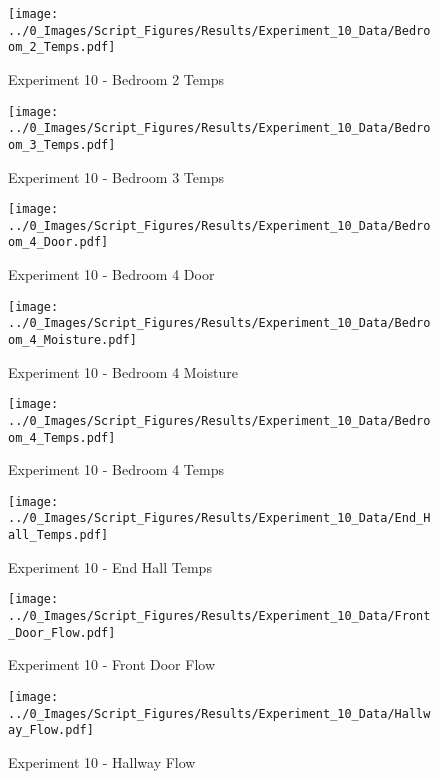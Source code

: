 	\begin{figure}[H]
		\centering
		\texttt{[image: ../0\_Images/Script\_Figures/Results/Experiment\_10\_Data/Bedroom\_2\_Temps.pdf]}
		\caption[]{Experiment 10 - Bedroom 2 Temps}
	\end{figure}
 
	\clearpage

	\begin{figure}[H]
		\centering
		\texttt{[image: ../0\_Images/Script\_Figures/Results/Experiment\_10\_Data/Bedroom\_3\_Temps.pdf]}
		\caption[]{Experiment 10 - Bedroom 3 Temps}
	\end{figure}
 

	\begin{figure}[H]
		\centering
		\texttt{[image: ../0\_Images/Script\_Figures/Results/Experiment\_10\_Data/Bedroom\_4\_Door.pdf]}
		\caption[]{Experiment 10 - Bedroom 4 Door}
	\end{figure}
 
	\clearpage

	\begin{figure}[H]
		\centering
		\texttt{[image: ../0\_Images/Script\_Figures/Results/Experiment\_10\_Data/Bedroom\_4\_Moisture.pdf]}
		\caption[]{Experiment 10 - Bedroom 4 Moisture}
	\end{figure}
 

	\begin{figure}[H]
		\centering
		\texttt{[image: ../0\_Images/Script\_Figures/Results/Experiment\_10\_Data/Bedroom\_4\_Temps.pdf]}
		\caption[]{Experiment 10 - Bedroom 4 Temps}
	\end{figure}
 
	\clearpage

	\begin{figure}[H]
		\centering
		\texttt{[image: ../0\_Images/Script\_Figures/Results/Experiment\_10\_Data/End\_Hall\_Temps.pdf]}
		\caption[]{Experiment 10 - End Hall Temps}
	\end{figure}
 

	\begin{figure}[H]
		\centering
		\texttt{[image: ../0\_Images/Script\_Figures/Results/Experiment\_10\_Data/Front\_Door\_Flow.pdf]}
		\caption[]{Experiment 10 - Front Door Flow}
	\end{figure}
 
	\clearpage

	\begin{figure}[H]
		\centering
		\texttt{[image: ../0\_Images/Script\_Figures/Results/Experiment\_10\_Data/Hallway\_Flow.pdf]}
		\caption[]{Experiment 10 - Hallway Flow}
	\end{figure}
 

